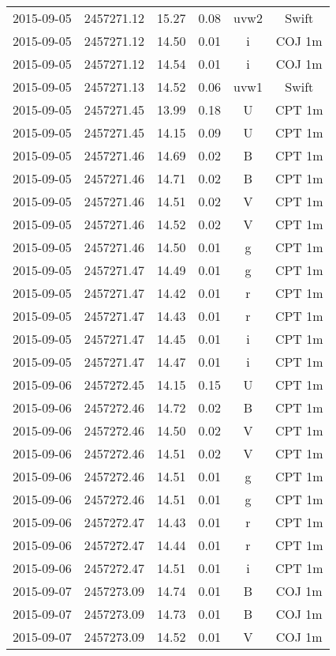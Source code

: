 \begin{table}
\begin{tabular}{cccccc}
2015-09-05 & 2457271.12 & 15.27 & 0.08 & uvw2 & Swift \\
2015-09-05 & 2457271.12 & 14.50 & 0.01 & i & COJ 1m \\
2015-09-05 & 2457271.12 & 14.54 & 0.01 & i & COJ 1m \\
2015-09-05 & 2457271.13 & 14.52 & 0.06 & uvw1 & Swift \\
2015-09-05 & 2457271.45 & 13.99 & 0.18 & U & CPT 1m \\
2015-09-05 & 2457271.45 & 14.15 & 0.09 & U & CPT 1m \\
2015-09-05 & 2457271.46 & 14.69 & 0.02 & B & CPT 1m \\
2015-09-05 & 2457271.46 & 14.71 & 0.02 & B & CPT 1m \\
2015-09-05 & 2457271.46 & 14.51 & 0.02 & V & CPT 1m \\
2015-09-05 & 2457271.46 & 14.52 & 0.02 & V & CPT 1m \\
2015-09-05 & 2457271.46 & 14.50 & 0.01 & g & CPT 1m \\
2015-09-05 & 2457271.47 & 14.49 & 0.01 & g & CPT 1m \\
2015-09-05 & 2457271.47 & 14.42 & 0.01 & r & CPT 1m \\
2015-09-05 & 2457271.47 & 14.43 & 0.01 & r & CPT 1m \\
2015-09-05 & 2457271.47 & 14.45 & 0.01 & i & CPT 1m \\
2015-09-05 & 2457271.47 & 14.47 & 0.01 & i & CPT 1m \\
2015-09-06 & 2457272.45 & 14.15 & 0.15 & U & CPT 1m \\
2015-09-06 & 2457272.46 & 14.72 & 0.02 & B & CPT 1m \\
2015-09-06 & 2457272.46 & 14.50 & 0.02 & V & CPT 1m \\
2015-09-06 & 2457272.46 & 14.51 & 0.02 & V & CPT 1m \\
2015-09-06 & 2457272.46 & 14.51 & 0.01 & g & CPT 1m \\
2015-09-06 & 2457272.46 & 14.51 & 0.01 & g & CPT 1m \\
2015-09-06 & 2457272.47 & 14.43 & 0.01 & r & CPT 1m \\
2015-09-06 & 2457272.47 & 14.44 & 0.01 & r & CPT 1m \\
2015-09-06 & 2457272.47 & 14.51 & 0.01 & i & CPT 1m \\
2015-09-07 & 2457273.09 & 14.74 & 0.01 & B & COJ 1m \\
2015-09-07 & 2457273.09 & 14.73 & 0.01 & B & COJ 1m \\
2015-09-07 & 2457273.09 & 14.52 & 0.01 & V & COJ 1m \\

\end{tabular}
\end{table}
